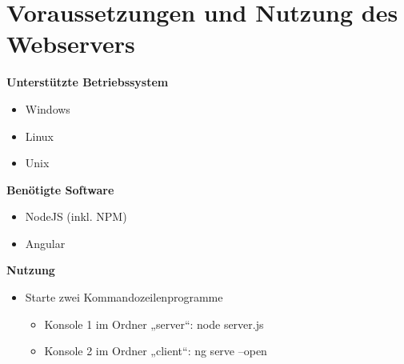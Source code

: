 \section{Voraussetzungen und Nutzung des Webservers}
\textbf{Unterstützte Betriebssystem}
\begin{itemize}
    \item Windows
    \item Linux
    \item Unix
\end{itemize} 
\textbf{Benötigte Software}
\begin{itemize}
    \item NodeJS (inkl. NPM)
    \item Angular
\end{itemize} 
\textbf{Nutzung}
\begin{itemize}
    \item Starte zwei Kommandozeilenprogramme
    \begin{itemize}
        \item Konsole 1 im Ordner „server“: node server.js 
        \item Konsole 2 im Ordner „client“: ng serve --open 
    \end{itemize}
\end{itemize} 
\newpage
